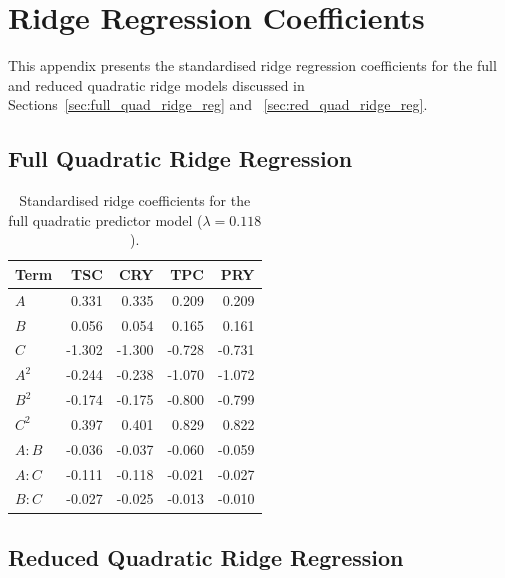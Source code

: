 \documentclass[MScDSA]{uccthesis}
\begin{document}
\chapter{Ridge Regression Coefficients}
\label{app:ridge_coefficients}
This appendix presents the standardised ridge regression coefficients for the full and reduced quadratic ridge models discussed in Sections~\ref{sec:full_quad_ridge_reg} and ~\ref{sec:red_quad_ridge_reg}.

\section{Full Quadratic Ridge Regression}
\label{app:full_quad_ridge_coef}

\begin{table}[H]
\centering
\small
\caption{Standardised ridge coefficients for the full quadratic predictor model ($\lambda = 0.118$).}
\label{tab:full_quad_ridge_coef}
\begin{tabular}{lrrrr}
\toprule
\textbf{Term} & \textbf{TSC} & \textbf{CRY} & \textbf{TPC} & \textbf{PRY} \\
\midrule
$A$ & 0.331 & 0.335 & 0.209 & 0.209 \\
$B$ & 0.056 & 0.054 & 0.165 & 0.161 \\
$C$ & -1.302 & -1.300 & -0.728 & -0.731 \\
$A^2$ & -0.244 & -0.238 & -1.070 & -1.072 \\
$B^2$ & -0.174 & -0.175 & -0.800 & -0.799 \\
$C^2$ & 0.397 & 0.401 & 0.829 & 0.822 \\
$A:B$ & -0.036 & -0.037 & -0.060 & -0.059 \\
$A:C$ & -0.111 & -0.118 & -0.021 & -0.027 \\
$B:C$ & -0.027 & -0.025 & -0.013 & -0.010 \\
\bottomrule
\end{tabular}
\end{table}

\section{Reduced Quadratic Ridge Regression}
\label{app:red_quad_ridge_coef}
\end{document}
